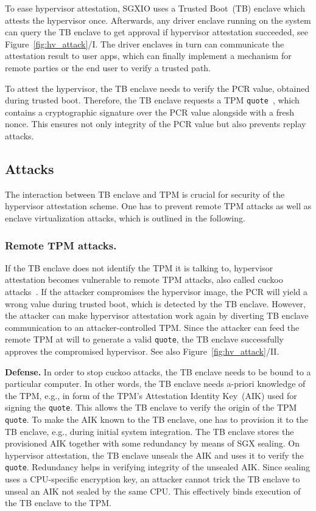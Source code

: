 \documentclass{sig-alternate-05-2015}
\begin{document}
To ease hypervisor attestation, SGXIO uses a Trusted Boot~(TB) enclave which attests the hypervisor once. 
Afterwards, any driver enclave running on the system can query the TB enclave to get approval if hypervisor attestation succeeded, see Figure~\ref{fig:hv_attack}/I. 
The driver enclaves in turn can communicate the attestation result to user apps, which can finally implement a mechanism for remote parties or the end user to verify a trusted path.

To attest the hypervisor, the TB enclave needs to verify the PCR value, obtained during trusted boot. 
Therefore, the TB enclave requests a TPM \texttt{quote}~\cite{tpm}, which contains a cryptographic signature over the PCR value alongside with a fresh nonce. 
This ensures not only integrity of the PCR value but also prevents replay attacks. 
 
\subsection{Attacks}
 The interaction between TB enclave and TPM is crucial for security of the hypervisor attestation scheme. 
One has to prevent remote TPM attacks as well as enclave virtualization attacks, which is outlined in the following.
 
\subsubsection{Remote TPM attacks.}

If the TB enclave does not identify the TPM it is talking to, hypervisor attestation becomes vulnerable to remote TPM attacks, also called cuckoo attacks~\cite{parno_bootstrapping_2008}. 
If the attacker compromises the hypervisor image, the PCR will yield a wrong value during trusted boot, which is detected by the TB enclave. 
However, the attacker can make hypervisor attestation work again by diverting TB enclave communication to an attacker-controlled TPM. 
Since the attacker can feed the remote TPM at will to generate a valid \texttt{quote}, the TB enclave successfully approves the compromised hypervisor. 
See also Figure~\ref{fig:hv_attack}/II. 

\textbf{Defense.}
In order to stop cuckoo attacks, the TB enclave needs to be bound to a particular computer. 
In other words, the TB enclave needs a-priori knowledge of the TPM, e.g., in form of the TPM's Attestation Identity Key~(AIK) used for signing the \texttt{quote}. 
This allows the TB enclave to verify the origin of the TPM \texttt{quote}. 
To make the AIK known to the TB enclave, one has to provision it to the TB enclave, e.g., during initial system integration. 
The TB enclave stores the provisioned AIK together with some redundancy by means of SGX sealing. 
On hypervisor attestation, the TB enclave unseals the AIK and uses it to verify the \texttt{quote}. 
Redundancy helps in verifying integrity of the unsealed AIK.
Since sealing uses a CPU-specific encryption key, an attacker cannot trick the TB enclave to unseal an AIK not sealed by the same CPU. 
This effectively binds execution of the TB enclave to the TPM.
\end{document}

